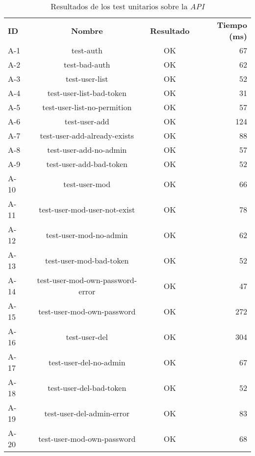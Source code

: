 \begin{table}\small
	\centering
	\begin{center}	
		\begin{tabular}{|lccr|}
			\toprule 
			\textbf{ID} & \textbf{Nombre} & \textbf{Resultado} & \textbf{Tiempo (ms)} \\ 
			\otoprule
			A-1 & test-auth & OK & 67 \\ 
			\hubu 
			A-2 & test-bad-auth & OK & 62 \\ 
			\hubu 
			A-3 & test-user-list & OK & 52 \\ 
			\hubu 
			A-4 & test-user-list-bad-token & OK & 31 \\ 
			\hubu 
			A-5 & test-user-list-no-permition & OK & 57 \\ 
			\hubu 
			A-6 & test-user-add & OK & 124 \\ 
			\hubu 
			A-7 & test-user-add-already-exists & OK & 88 \\ 
			\hubu 
			A-8 & test-user-add-no-admin & OK & 57\\ 
			\hubu 
			A-9 & test-user-add-bad-token & OK & 52\\ 
			\hubu 
			A-10 & test-user-mod & OK &  66\\ 
			\hubu 
			A-11 & test-user-mod-user-not-exist & OK & 78 \\ 
			\hubu 
			A-12 & test-user-mod-no-admin & OK & 62 \\ 
			\hubu 
			A-13 & test-user-mod-bad-token & OK & 52 \\ 
			\hubu 
			A-14 & test-user-mod-own-password-error & OK & 47 \\ 
			\hubu 
			A-15 & test-user-mod-own-password & OK & 272 \\ 
			\hubu 
			A-16 & test-user-del & OK & 304 \\ 
			\hubu 
			A-17 & test-user-del-no-admin & OK & 67 \\ 
			\hubu 
			A-18 & test-user-del-bad-token & OK & 52 \\ 
			\hubu 
			A-19 & test-user-del-admin-error & OK & 83 \\ 
			\hubu 
			A-20 & test-user-mod-own-password & OK & 68 \\ 
			\bottomrule
		\end{tabular} 
	\end{center}
	\caption{Resultados de los test unitarios sobre la \textit{API}}
	\label{tab:test_api}
\end{table}